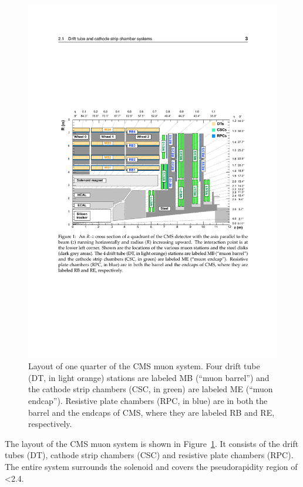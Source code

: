 \begin{figure}[htbp]
  \centering
  \leavevmode
  \includegraphics[width=\columnwidth]{muon_system}
  \caption{Layout of one quarter of the CMS muon system. Four drift tube (DT, in light orange) stations are labeled MB
  (“muon barrel”) and the cathode strip chambers (CSC, in green) are labeled ME (“muon endcap”). Resistive plate
  chambers (RPC, in blue) are in both the barrel and the endcaps of CMS, where they are labeled RB and RE,
  respectively.}
  \label{fig:muon_system}
\end{figure}

The layout of the CMS muon system is shown in Figure~\ref{fig:muon_system}. It consists of the drift tubes (DT), cathode
strip chambers (CSC) and resistive plate chambers (RPC). The entire system surrounds the solenoid and covers the
pseudorapidity region of \abs\eta \num{<2.4}.


